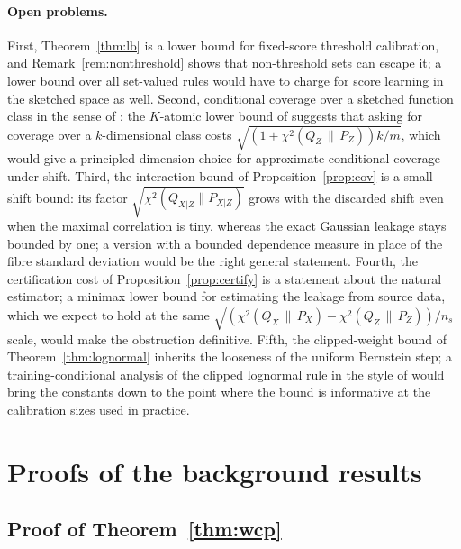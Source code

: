 \documentclass[11pt,a4paper]{article}
\newcommand{\PX}{P_X}
\newcommand{\QX}{Q_X}
\newcommand{\chisq}{\chi^2(\QX\,\|\,\PX)}
\newcommand{\chisqZ}{\chi^2(Q_Z\,\|\,P_Z)}
\theoremstyle{plain}
\theoremstyle{definition}
\theoremstyle{remark}
\begin{document}
\paragraph{Open problems.}
First, Theorem~\ref{thm:lb} is a lower bound for fixed-score threshold calibration, and Remark~\ref{rem:nonthreshold} shows that non-threshold sets can escape it; a lower bound over all set-valued rules would have to charge for score learning in the sketched space as well. Second, conditional coverage over a sketched function class in the sense of \cite{gibbs2023}: the $K$-atomic lower bound of \cite{isaev2026} suggests that asking for coverage over a $k$-dimensional class costs $\sqrt{(1+\chisqZ)k/m}$, which would give a principled dimension choice for approximate conditional coverage under shift. Third, the interaction bound of Proposition~\ref{prop:cov} is a small-shift bound: its factor $\sqrt{\chi^2(Q_{X|Z}\|P_{X|Z})}$ grows with the discarded shift even when the maximal correlation is tiny, whereas the exact Gaussian leakage stays bounded by one; a version with a bounded dependence measure in place of the fibre standard deviation would be the right general statement. Fourth, the certification cost of Proposition~\ref{prop:certify} is a statement about the natural estimator; a minimax lower bound for estimating the leakage from source data, which we expect to hold at the same $\sqrt{(\chisq-\chisqZ)/n_s}$ scale, would make the obstruction definitive. Fifth, the clipped-weight bound of Theorem~\ref{thm:lognormal} inherits the looseness of the uniform Bernstein step; a training-conditional analysis of the clipped lognormal rule in the style of \cite{pournaderi2026} would bring the constants down to the point where the bound is informative at the calibration sizes used in practice.


\appendix


\section{Proofs of the background results}\label{app:background}

\subsection{Proof of Theorem~\ref{thm:wcp}}\label{app:wcp}
\end{document}
